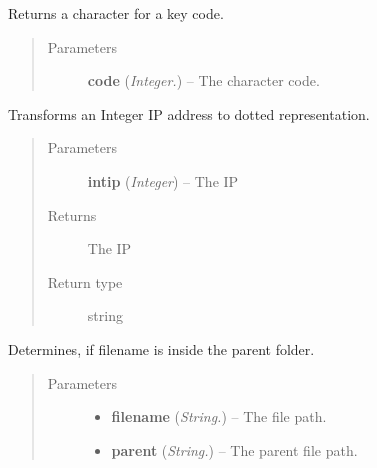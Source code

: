 \documentclass[letterpaper,10pt,english]{sphinxmanual}
\begin{document}

\begin{fulllineitems}
\label{api:utils.GetSendkeys}
Returns a character for a key code.
\begin{quote}\begin{description}
\item[{Parameters}] \leavevmode
\textbf{code} (\emph{Integer.}) -- The character code.

\end{description}\end{quote}

\end{fulllineitems}


\begin{fulllineitems}
\label{api:utils.IntToDottedIP}
Transforms an Integer IP address to dotted representation.
\begin{quote}\begin{description}
\item[{Parameters}] \leavevmode
\textbf{intip} (\emph{Integer}) -- The IP

\item[{Returns}] \leavevmode
The IP

\item[{Return type}] \leavevmode
string

\end{description}\end{quote}

\end{fulllineitems}


\begin{fulllineitems}
\label{api:utils.IsSubtree}
Determines, if filename is inside the parent folder.
\begin{quote}\begin{description}
\item[{Parameters}] \leavevmode\begin{itemize}
\item {} 
\textbf{filename} (\emph{String.}) -- The file path.

\item {} 
\textbf{parent} (\emph{String.}) -- The parent file path.

\end{itemize}

\end{description}\end{quote}

\end{fulllineitems}
\end{document}
